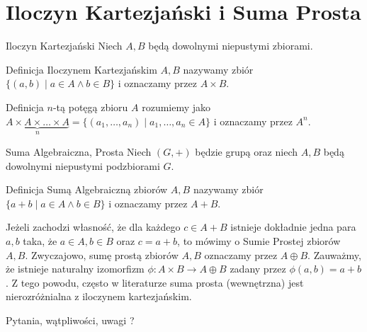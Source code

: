 \documentclass{beamer}
\begin{document}
\section{Iloczyn Kartezjański i Suma Prosta}
\begin{frame}{Iloczyn Kartezjański}
    Niech $A,B$ będą dowolnymi niepustymi zbiorami.
    \begin{block}{Definicja}
         \alert{Iloczynem Kartezjańskim} $A,B$ nazywamy zbiór
        $\{(a,b) \mid a \in A \land b \in B\}$ i oznaczamy przez $A \times B$.
    \end{block}
    \begin{block}{Definicja}
        $n$-tą potęgą zbioru $A$ rozumiemy jako $ \underbrace{A \times A \times \ldots \times A}_{n} 
        = \{(a_1,\ldots, a_n) \mid a_1,\ldots,a_n \in A \}$ i oznaczamy  przez $A^n$.
    \end{block}
\end{frame}

\begin{frame}{Suma Algebraiczna, Prosta}
    Niech $(G, +)$ będzie grupą oraz niech $A,B$ będą dowolnymi niepustymi podzbiorami $G$.
    \begin{block}{Definicja}
        \alert{Sumą Algebraiczną} zbiorów $A,B$ nazywamy zbiór $\{ a + b \mid a \in A \land b \in B\}$
        i oznaczamy przez $A + B$.
    \end{block}
    Jeżeli zachodzi własność, że dla każdego $c \in A +B $ istnieje dokładnie jedna para $a,b$ taka, że $a \in A, b \in B$ oraz $c = a +b$, 
    to mówimy o \alert{Sumie Prostej} zbiorów $A,B$. Zwyczajowo, sumę prostą zbiorów $A,B$ oznaczamy przez $A \oplus B$. 
    \pause 
    Zauważmy, że istnieje naturalny izomorfizm  $ \phi : A \times B \rightarrow A \oplus B$ zadany przez
    $\phi(a,b) = a + b$. Z tego powodu, często w literaturze suma prosta (wewnętrzna) jest nierozróżnialna z iloczynem kartezjańskim. 
\end{frame}

\begin{frame}
        \centering 
        \LARGE Pytania, wątpliwości, uwagi ? 
\end{frame}
\end{document}
